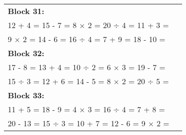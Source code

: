 \documentclass[a4paper,12pt]{scrartcl}
\begin{document}
\begin{adjustbox}{center, valign=c}
\begin{tabular}{@{}p{0.95\linewidth}@{}}
\textbf{Block 31:}\\
12 + 4 = \hfill 15 - 7 = \hfill 8 × 2 = \hfill 20 ÷ 4 = \hfill 11 + 3 =\\
9 × 2 = \hfill 14 - 6 = \hfill 16 ÷ 4 = \hfill 7 + 9 = \hfill 18 - 10 =\\[0.6em]

\textbf{Block 32:}\\
17 - 8 = \hfill 13 + 4 = \hfill 10 ÷ 2 = \hfill 6 × 3 = \hfill 19 - 7 =\\
15 ÷ 3 = \hfill 12 + 6 = \hfill 14 - 5 = \hfill 8 × 2 = \hfill 20 ÷ 5 =\\[0.6em]

\textbf{Block 33:}\\
11 + 5 = \hfill 18 - 9 = \hfill 4 × 3 = \hfill 16 ÷ 4 = \hfill 7 + 8 =\\
20 - 13 = \hfill 15 ÷ 3 = \hfill 10 + 7 = \hfill 12 - 6 = \hfill 9 × 2 =\\[0.6em]

\end{tabular}
\end{adjustbox}
\end{document}
